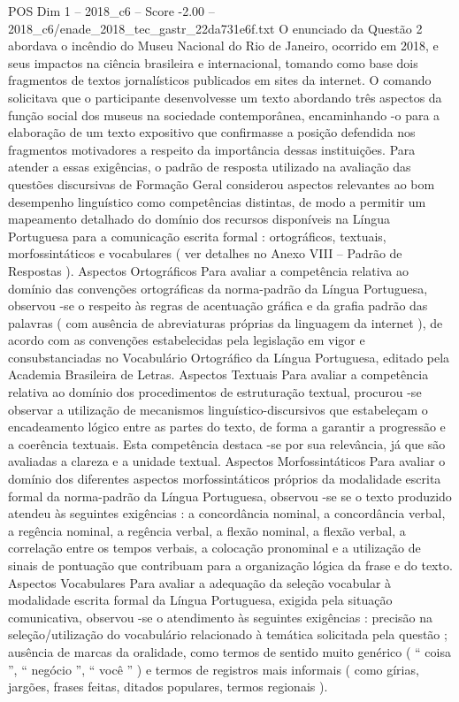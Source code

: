 \begin{textsample}{POS Dim 1 – 2018\_c6 – Score -2.00 – 2018\_c6/enade\_2018\_tec\_gastr\_22da731e6f.txt}
O enunciado da Questão 2 abordava o incêndio do Museu Nacional do Rio de Janeiro, ocorrido em 2018, e seus impactos na ciência brasileira e internacional, tomando como base dois fragmentos de textos jornalísticos publicados em sites da internet.
O comando solicitava que o participante desenvolvesse um texto abordando três aspectos da função social dos museus na sociedade contemporânea, encaminhando -o para a elaboração de um texto expositivo que confirmasse a posição defendida nos fragmentos motivadores a respeito da importância dessas instituições.
Para atender a essas exigências, o padrão de resposta utilizado na avaliação das questões discursivas de Formação Geral considerou aspectos relevantes ao bom desempenho linguístico como competências distintas, de modo a permitir um mapeamento detalhado do domínio dos recursos disponíveis na Língua Portuguesa para a comunicação escrita formal : ortográficos, textuais, morfossintáticos e vocabulares ( ver detalhes no Anexo VIII – Padrão de Respostas ).
Aspectos Ortográficos Para avaliar a competência relativa ao domínio das convenções ortográficas da norma-padrão da Língua Portuguesa, observou -se o respeito às regras de acentuação gráfica e da grafia padrão das palavras ( com ausência de abreviaturas próprias da linguagem da internet ), de acordo com as convenções estabelecidas pela legislação em vigor e consubstanciadas no Vocabulário Ortográfico da Língua Portuguesa, editado pela Academia Brasileira de Letras.
Aspectos Textuais Para avaliar a competência relativa ao domínio dos procedimentos de estruturação textual, procurou -se observar a utilização de mecanismos linguístico-discursivos que estabeleçam o encadeamento lógico entre as partes do texto, de forma a garantir a progressão e a coerência textuais.
Esta competência destaca -se por sua relevância, já que são avaliadas a clareza e a unidade textual.
Aspectos Morfossintáticos Para avaliar o domínio dos diferentes aspectos morfossintáticos próprios da modalidade escrita formal da norma-padrão da Língua Portuguesa, observou -se se o texto produzido atendeu às seguintes exigências : a concordância nominal, a concordância verbal, a regência nominal, a regência verbal, a flexão nominal, a flexão verbal, a correlação entre os tempos verbais, a colocação pronominal e a utilização de sinais de pontuação que contribuam para a organização lógica da frase e do texto.
Aspectos Vocabulares Para avaliar a adequação da seleção vocabular à modalidade escrita formal da Língua Portuguesa, exigida pela situação comunicativa, observou -se o atendimento às seguintes exigências : precisão na seleção/utilização do vocabulário relacionado à temática solicitada pela questão ; ausência de marcas da oralidade, como termos de sentido muito genérico ( “ coisa ”, “ negócio ”, “ você ” ) e termos de registros mais informais ( como gírias, jargões, frases feitas, ditados populares, termos regionais ).

\end{textsample}
